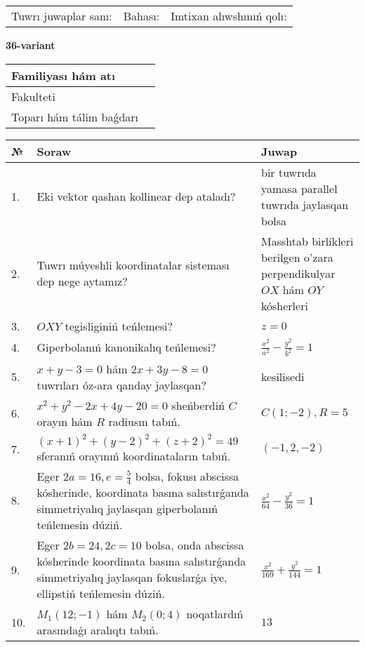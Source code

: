 \documentclass{article}
\begin{document}
\vspace{1cm}

\begin{tabular}{lll}
Tuwrı juwaplar sanı: \underline{\hspace{1.5cm}} & 
Bahası: \underline{\hspace{1.5cm}} & 
Imtixan alıwshınıń qolı: \underline{\hspace{2cm}} \\
\end{tabular}

\egroup

\newpage


\textbf{36-variant}\\

\bgroup
\def\arraystretch{1.6} %

\begin{tabular}{|m{5.7cm}|m{9.5cm}|}
\hline
Familiyası hám atı & \\
\hline
Fakulteti  & \\
\hline
Toparı hám tálim baǵdarı  & \\
\hline
\end{tabular}

\vspace{1cm}

\begin{tabular}{|m{0.7cm}|m{10cm}|m{4cm}|}
\hline
№ & Soraw & Juwap \\
\hline
1. & Eki vektor qashan kollinear dep ataladı? & bir tuwrıda yamasa parallel tuwrıda jaylasqan bolsa \\
\hline
2. & Tuwrı múyeshli koordinatalar sisteması dep nege aytamız? & Masshtab birlikleri berilgen o'zara perpendikulyar $OX$ hám $OY$ kósherleri \\
\hline
3. & $OXY$ tegisliginiń teńlemesi? & $z=0$ \\
\hline
4. & Giperbolanıń kanonikalıq teńlemesi? & $\frac{x^2}{a^2}-\frac{y^2}{b^2}=1$ \\
\hline
5. & $x+y-3=0$ hám $2x+3y-8=0$ tuwrıları óz-ara qanday jaylasqan? & kesilisedi \\
\hline
6. & $x^{2}+y^{2}-2x+4y-20=0$ sheńberdiń $C$ orayın hám $R$ radiusın tabıń. & $C(1;-2), R=5$ \\
\hline
7. & $(x+1)^{2}+(y-2) ^{2}+(z+2) ^{2}=49$ sferanıń orayınıń koordinataların tabıń. & $(-1,2,-2)$ \\
\hline
8. & Eger $2a=16, e=\frac{5}{4}$ bolsa, fokusı abscissa kósherinde, koordinata basına salıstırǵanda simmetriyalıq jaylasqan giperbolanıń teńlemesin dúziń. & $\frac{x^{2}}{64}-\frac{y^{2}}{36}=1$ \\
\hline
9. & Eger $2b=24, 2 c=10$ bolsa, onda abscissa kósherinde koordinata basına salıstırǵanda simmetriyalıq jaylasqan fokuslarǵa iye, ellipstiń teńlemesin dúziń. & $\frac{x^{2}}{169}+\frac{y^{2}}{144}=1$ \\
\hline
10. & $M_{1} (12;-1)$ hám $M_{2} (0;4)$ noqatlardıń arasındaǵı aralıqtı tabıń. & $13$ \\
\hline
\end{tabular}
\end{document}
